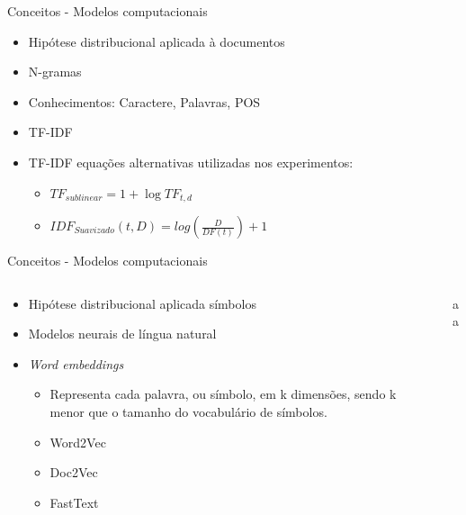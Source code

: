 \begin{frame}{Conceitos - Modelos computacionais}
\begin{tcolorbox}[title=Modelo tradicional de representação textual,valign=center]
	\begin{itemize}
		\item Hipótese distribucional aplicada à documentos \cite{Turney2010}
		\item N-gramas
		\item Conhecimentos: Caractere, Palavras, POS
		\item TF-IDF
		\item TF-IDF equações alternativas utilizadas nos experimentos:
			\begin{itemize}
				\item $ TF_{sublinear} = 1 + \log TF_{t,d}$ 
				\item $
				IDF_{Suavizado}(t,D) = log\left (
				\frac{D}{DF(t)}
				\right ) + 1
				$
			\end{itemize}
	\end{itemize}	
\end{tcolorbox}
\end{frame}


\begin{frame}{Conceitos - Modelos computacionais}

\begin{columns}
	\begin{column}{0.48\textwidth}
		\begin{tcolorbox}[title=Modelo de representação distribuída,valign=center]
			\begin{itemize}
				\item Hipótese distribucional aplicada símbolos
				\item Modelos neurais de língua natural \cite{Bengio2003}
				\item {\it Word embeddings} 
				\begin{itemize}
					\item Representa cada palavra, ou símbolo, em k dimensões, sendo k menor que o tamanho do vocabulário de símbolos.
					\item Word2Vec \cite{Mikolov2013}
					\item Doc2Vec \cite{QuocLe2014}
					\item FastText 
				\end{itemize}
			\end{itemize}
		\end{tcolorbox}
	\end{column}
	\begin{column}{0.48\textwidth}
		aa
	\end{column}
\end{columns}

\end{frame}
